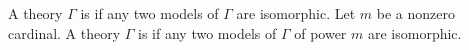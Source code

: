 A theory $\Gamma$ is  if any two models of $\Gamma$ are isomorphic. Let $m$ be a nonzero cardinal. A theory $\Gamma$ is  if any two models of $\Gamma$ of power $m$ are isomorphic.
